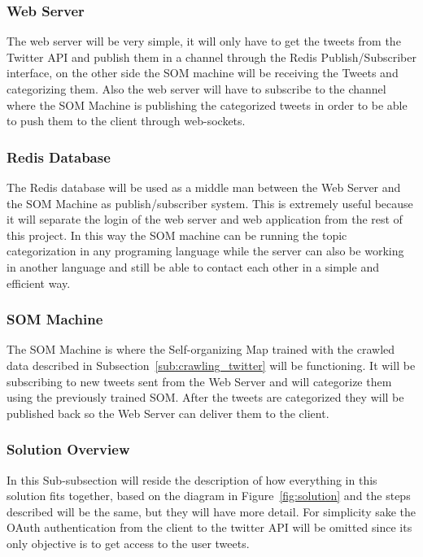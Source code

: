 \subsubsection{Web Server} %
\label{ssub:web_server}
The web server will be very simple, it will only have to get the tweets from the Twitter API and publish them in a channel through the Redis Publish/Subscriber interface, on the other side the SOM machine will be receiving the Tweets and categorizing them. Also the web server will have to subscribe to the channel where the SOM Machine is publishing the categorized tweets in order to be able to push them to the client through web-sockets.

\subsubsection{Redis Database} %
\label{ssub:redis_database}
The Redis database will be used as a middle man between the Web Server and the SOM Machine as publish/subscriber system. This is extremely useful because it will separate the login of the web server and web application from the rest of this project. In this way the SOM machine can be running the topic categorization in any programing language while the server can also be working in another language and still be able to contact each other in a simple and efficient way.

\subsubsection{SOM Machine} %
\label{ssub:som_machine}
The SOM Machine is where the Self-organizing Map trained with the crawled data described in Subsection~\ref{sub:crawling_twitter} will be functioning. It will be subscribing to new tweets sent from the Web Server and will categorize them using the previously trained SOM. After the tweets are categorized they will be published back so the Web Server can deliver them to the client.

\subsubsection{Solution Overview} %
\label{ssub:solution_overview}
In this Sub-subsection will reside the description of how everything in this solution fits together, based on the diagram in Figure~\ref{fig:solution} and the steps described will be the same, but they will have more detail. For simplicity sake the OAuth authentication from the client to the twitter API will be omitted since its only objective is to get access to the user tweets.

